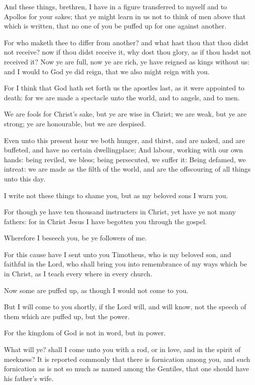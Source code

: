 \Verse And these things, brethren, I have in a figure transferred to myself and to Apollos for your sakes; that ye might learn in us not to think of men above that which is written, that no one of you be puffed up for one against another.

\Verse For who maketh thee to differ from another? and what hast thou that thou didst not receive? now if thou didst receive it, why dost thou glory, as if thou hadst not received it?  \Verse Now ye are full, now ye are rich, ye have reigned as kings without us: and I would to God ye did reign, that we also might reign with you.

\Verse For I think that God hath set forth us the apostles last, as it were appointed to death: for we are made a spectacle unto the world, and to angels, and to men.

\Verse We are fools for Christ's sake, but ye are wise in Christ; we are weak, but ye are strong; ye are honourable, but we are despised.

\Verse Even unto this present hour we both hunger, and thirst, and are naked, and are buffeted, and have no certain dwellingplace; \Verse And labour, working with our own hands: being reviled, we bless; being persecuted, we suffer it: \Verse Being defamed, we intreat: we are made as the filth of the world, and are the offscouring of all things unto this day.

\Verse I write not these things to shame you, but as my beloved sons I warn you.

\Verse For though ye have ten thousand instructers in Christ, yet have ye not many fathers: for in Christ Jesus I have begotten you through the gospel.

\Verse Wherefore I beseech you, be ye followers of me.

\Verse For this cause have I sent unto you Timotheus, who is my beloved son, and faithful in the Lord, who shall bring you into remembrance of my ways which be in Christ, as I teach every where in every church.

\Verse Now some are puffed up, as though I would not come to you.

\Verse But I will come to you shortly, if the Lord will, and will know, not the speech of them which are puffed up, but the power.

\Verse For the kingdom of God is not in word, but in power.

\Verse What will ye? shall I come unto you with a rod, or in love, and in the spirit of meekness?  
\Chapter
\Verse It is reported commonly that there is fornication among you, and such fornication as is not so much as named among the Gentiles, that one should have his father's wife.

